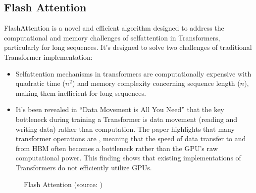 \documentclass[letterpaper,11pt,english]{sphinxmanual}
\begin{document}
\subsection{Flash Attention}
\label{\detokenize{pretraining:flash-attention}}
\sphinxAtStartPar
FlashAttention  is a novel and
efficient algorithm designed to address the computational and memory
challenges of self\sphinxhyphen{}attention in Transformers, particularly for long
sequences. It’s designed to solve two challenges of traditional
Transformer implementation:
\begin{itemize}
\item {} 
\sphinxAtStartPar
Self\sphinxhyphen{}attention mechanisms in transformers are computationally
expensive with quadratic time (\(n^2\)) and memory complexity
concerning sequence length (\(n\)), making them inefficient for
long sequences.

\item {} 
\sphinxAtStartPar
It’s been revealed in “Data Movement is All You Need”  that the
key bottleneck during training a Transformer is data movement (reading
and writing data) rather than computation. The paper highlights that
many transformer operations are , meaning
that the speed of data transfer to and from HBM often becomes a
bottleneck rather than the GPU’s raw computational power. This finding
shows that existing implementations of Transformers do not efficiently
utilize GPUs.

\end{itemize}

\begin{figure}[htbp]
\centering
\capstart

\noindent{}
\caption{Flash Attention (source: )}\label{\detokenize{pretraining:id21}}\end{figure}
\end{document}
